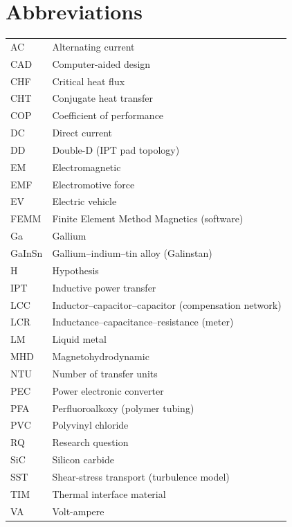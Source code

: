 \chapter*{Abbreviations}

\begin{longtable}[l]{>{\raggedright}p{}>{\raggedright\arraybackslash}p{}}
  AC    & Alternating current \\
  CAD   & Computer-aided design \\
  CHF   & Critical heat flux \\
  CHT   & Conjugate heat transfer \\
  COP   & Coefficient of performance \\
  DC    & Direct current \\
  DD    & Double-D (IPT pad topology) \\
  EM    & Electromagnetic \\
  EMF   & Electromotive force \\
  EV    & Electric vehicle \\
  FEMM  & Finite Element Method Magnetics (software) \\
  Ga    & Gallium \\
  GaInSn & Gallium--indium--tin alloy (Galinstan) \\
  H     & Hypothesis \\
  IPT   & Inductive power transfer \\
  LCC   & Inductor--capacitor--capacitor (compensation network) \\
  LCR   & Inductance--capacitance--resistance (meter) \\
  LM    & Liquid metal \\
  MHD   & Magnetohydrodynamic \\
  NTU   & Number of transfer units \\
  PEC   & Power electronic converter \\
  PFA   & Perfluoroalkoxy (polymer tubing) \\
  PVC   & Polyvinyl chloride \\
  RQ    & Research question \\
  SiC   & Silicon carbide \\
  SST   & Shear-stress transport (turbulence model) \\
  TIM   & Thermal interface material \\
  VA    & Volt-ampere \\
\end{longtable}
\addtocounter{table}{-1}
